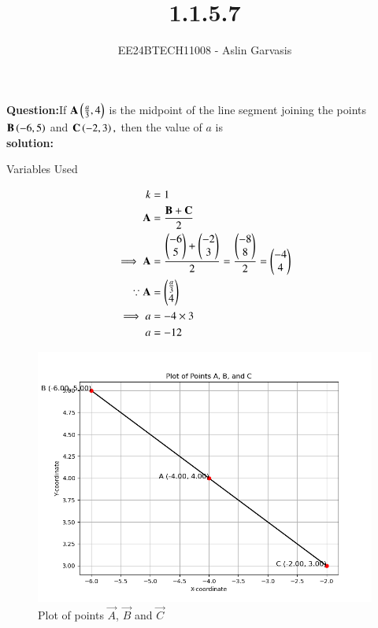 \documentclass[journal]{IEEEtran}
\begin{document}

\vspace{3cm}
\title{1.1.5.7}
\author{EE24BTECH11008 - Aslin Garvasis
}
{\let\newpage\relax\maketitle}

\renewcommand{\thefigure}{\theenumi}
\renewcommand{\thetable}{\theenumi}
\setlength{\intextsep}{10pt} %


\renewcommand{\thetable}{\theenumi}
 \textbf{Question:}If $\mathbf{A}\left(\frac{a}{3},4\right)$ is the midpoint of the line segment joining the points $\mathbf{B}\left(-6,5\right)$ and $\mathbf{C}\left(-2,3\right),$  
		then the value of $a$ is\\
 
\textbf{solution:}\\
\begin{table}[h!]    
  \centering
  
  \caption{Variables Used}
  \label{tab1.1.5.7}
\end{table}
\begin{align}
	k&=1\\
 \mathbf{A}&=\frac{\mathbf{B}+\mathbf{C}}{2}\\ 
\implies \mathbf{A}&=\frac{\begin{pmatrix}-6\\5\end{pmatrix}+\begin{pmatrix}-2\\3\end{pmatrix}}{2}=\frac{\begin{pmatrix}-8\\8\end{pmatrix}}{2}=\begin{pmatrix}-4\\4\end{pmatrix}\\
\because \mathbf{A}&=\begin{pmatrix}\frac{a}{3}\\4\end{pmatrix}\\
\implies a&=-4\times3\\ 
 a&=-12
\end{align}
		\newpage


		\begin{figure}[h!]
                \centering
               \includegraphics[width=0.7\linewidth]{figs/Fig1.png}
			\caption{Plot of points $\vec{A}$, $\vec{B}$ and $\vec{C}$}
               
               \end{figure}
\end{document}
